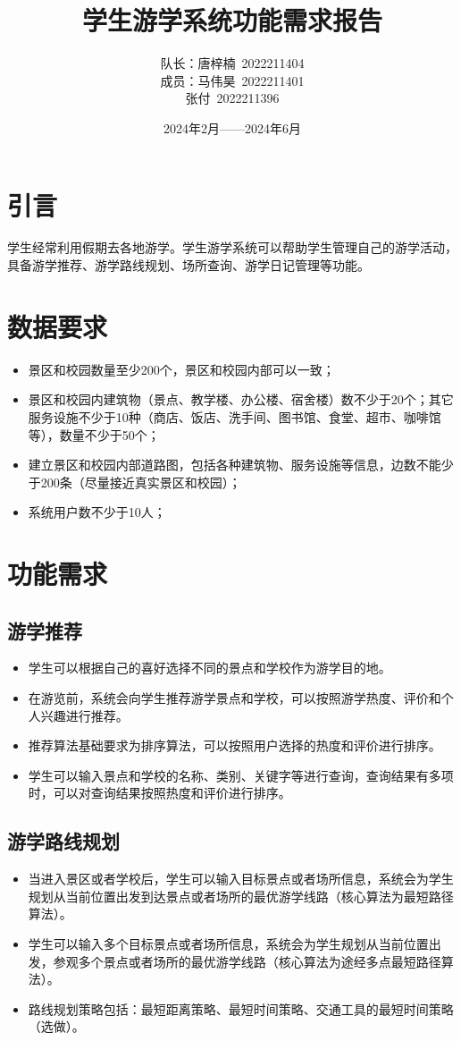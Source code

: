 \documentclass[a4paper, 12pt]{ctexart}
\title{学生游学系统功能需求报告}
\author{队长：唐梓楠\ 2022211404 \\ 成员：马伟昊\ 2022211401 \\\phantom{成员：}张\quad 付\ 2022211396}
\date{2024年2月——2024年6月}
\begin{document}
\maketitle

\section{引言}
学生经常利用假期去各地游学。学生游学系统可以帮助学生管理自己的游学活动，具备游学推荐、游学路线规划、场所查询、游学日记管理等功能。

\section{数据要求}
\begin{itemize}
    \item 景区和校园数量至少200个，景区和校园内部可以一致；
    \item 景区和校园内建筑物（景点、教学楼、办公楼、宿舍楼）数不少于20个；其它服务设施不少于10种（商店、饭店、洗手间、图书馆、食堂、超市、咖啡馆等），数量不少于50个；
    \item 建立景区和校园内部道路图，包括各种建筑物、服务设施等信息，边数不能少于200条（尽量接近真实景区和校园）；
    \item 系统用户数不少于10人；
\end{itemize}

\section{功能需求}
\subsection{游学推荐}
\begin{itemize}
    \item 学生可以根据自己的喜好选择不同的景点和学校作为游学目的地。
    \item 在游览前，系统会向学生推荐游学景点和学校，可以按照游学热度、评价和个人兴趣进行推荐。
    \item 推荐算法基础要求为排序算法，可以按照用户选择的热度和评价进行排序。
    \item 学生可以输入景点和学校的名称、类别、关键字等进行查询，查询结果有多项时，可以对查询结果按照热度和评价进行排序。
\end{itemize}

\subsection{游学路线规划}
\begin{itemize}
    \item 当进入景区或者学校后，学生可以输入目标景点或者场所信息，系统会为学生规划从当前位置出发到达景点或者场所的最优游学线路（核心算法为最短路径算法）。
    \item 学生可以输入多个目标景点或者场所信息，系统会为学生规划从当前位置出发，参观多个景点或者场所的最优游学线路（核心算法为途经多点最短路径算法）。
    \item 路线规划策略包括：最短距离策略、最短时间策略、交通工具的最短时间策略（选做）。
\end{itemize}
\end{document}
